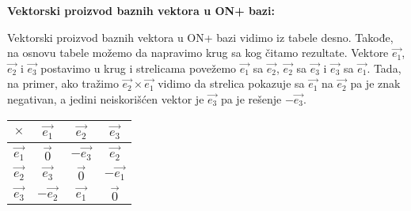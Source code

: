 \documentclass[12pt]{article}
\newcommand{\vek}[1]{\overrightarrow{#1}}
\begin{document}
\textbf{Vektorski proizvod baznih vektora u ON+ bazi:}\\[0.1cm]
\noindent
\begin{minipage}{0.65\textwidth}
    \begin{flushleft}
        Vektorski proizvod baznih vektora u ON+ bazi vidimo iz tabele desno.
        Takođe, na osnovu tabele možemo da napravimo krug sa kog čitamo
        rezultate. Vektore $\vek{e_1}$, $\vek{e_2}$ i $\vek{e_3}$ postavimo u
        krug i strelicama povežemo $\vek{e_1}$ sa $\vek{e_2}$, $\vek{e_2}$ sa
        $\vek{e_3}$ i $\vek{e_3}$ sa $\vek{e_1}$. Tada, na primer, ako tražimo
        $\vek{e_2}\times\vek{e_1}$ vidimo da strelica pokazuje sa $\vek{e_1}$
        na $\vek{e_2}$ pa je znak negativan, a jedini neiskorišćen vektor je
        $\vek{e_3}$ pa je rešenje $-\vek{e_3}$.
    \end{flushleft}
\end{minipage}
\hfill
\begin{minipage}{0.3\textwidth}
    \centering
    \begin{tabular}{|c|c|c|c|}
        \hline
        $\times$    & $\vek{e_1}$  & $\vek{e_2}$  & $\vek{e_3}$  \\
        \hline
        $\vek{e_1}$ & $\vek{0}$    & $-\vek{e_3}$ & $\vek{e_2}$  \\
        \hline
        $\vek{e_2}$ & $\vek{e_3}$  & $\vek{0}$    & $-\vek{e_1}$ \\
        \hline
        $\vek{e_3}$ & $-\vek{e_2}$ & $\vek{e_1}$  & $\vek{0}$    \\
        \hline
    \end{tabular}
\end{minipage}
\par
\end{document}
